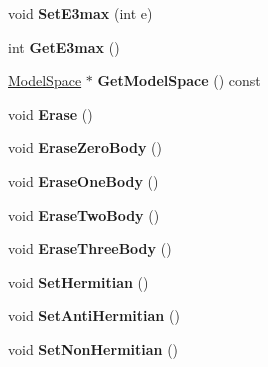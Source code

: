 \begin{DoxyCompactItemize}
\item 
\hypertarget{classOperator_a8b32ed75e5e0d6175a2f2f517c63a89c}{void {\bfseries Set\-E3max} (int e)}\label{classOperator_a8b32ed75e5e0d6175a2f2f517c63a89c}

\item 
\hypertarget{classOperator_a42d67df774701e40e2c49e539a68c937}{int {\bfseries Get\-E3max} ()}\label{classOperator_a42d67df774701e40e2c49e539a68c937}

\item 
\hypertarget{classOperator_a037a75a9f8a0dc970e56240552cc96d2}{\hyperlink{classModelSpace}{Model\-Space} $\ast$ {\bfseries Get\-Model\-Space} () const }\label{classOperator_a037a75a9f8a0dc970e56240552cc96d2}

\item 
\hypertarget{classOperator_a8a0f7d6aa5163929850d06b31dc24a55}{void {\bfseries Erase} ()}\label{classOperator_a8a0f7d6aa5163929850d06b31dc24a55}

\item 
\hypertarget{classOperator_aee08b8c721271c700f325e02ba7b47d1}{void {\bfseries Erase\-Zero\-Body} ()}\label{classOperator_aee08b8c721271c700f325e02ba7b47d1}

\item 
\hypertarget{classOperator_ab26470d0c88d61699443223675e57bbe}{void {\bfseries Erase\-One\-Body} ()}\label{classOperator_ab26470d0c88d61699443223675e57bbe}

\item 
\hypertarget{classOperator_a5c49da3f408b79a7430af4e3ec1ff8df}{void {\bfseries Erase\-Two\-Body} ()}\label{classOperator_a5c49da3f408b79a7430af4e3ec1ff8df}

\item 
\hypertarget{classOperator_a5e26abdcd6cc57d804ee25f645d42a0c}{void {\bfseries Erase\-Three\-Body} ()}\label{classOperator_a5e26abdcd6cc57d804ee25f645d42a0c}

\item 
\hypertarget{classOperator_aacf220459ab56d57e8c585a5293c5d4f}{void {\bfseries Set\-Hermitian} ()}\label{classOperator_aacf220459ab56d57e8c585a5293c5d4f}

\item 
\hypertarget{classOperator_a11bd88adeab50ade02c514a1e72ffffb}{void {\bfseries Set\-Anti\-Hermitian} ()}\label{classOperator_a11bd88adeab50ade02c514a1e72ffffb}

\item 
\hypertarget{classOperator_a80823b246f657f9a8e26d1462492e116}{void {\bfseries Set\-Non\-Hermitian} ()}\label{classOperator_a80823b246f657f9a8e26d1462492e116}


\end{DoxyCompactItemize}
